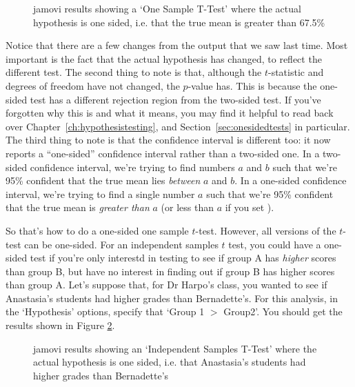 \begin{figure}[h]
\begin{center}
\caption{jamovi results showing a `One Sample T-Test' where the actual hypothesis is one sided, i.e. that the true mean is greater than 67.5\%}
\label{fig:ttest_onesided1}
\end{center}
\end{figure}

Notice that there are a few changes from the output that we saw last time. Most important is the fact that the actual hypothesis has changed, to reflect the different test. The second thing to note is that, although the $t$-statistic and degrees of freedom have not changed, the $p$-value has. This is because the one-sided test has a different rejection region from the two-sided test. If you've forgotten why this is and what it means, you may find it helpful to read back over Chapter~\ref{ch:hypothesistesting}, and Section~\ref{sec:onesidedtests} in particular. The third thing to note is that the confidence interval is different too: it now reports a ``one-sided'' confidence interval rather than a two-sided one. In a two-sided confidence interval, we're trying to find numbers $a$ and $b$ such that we're 95\% confident that the true mean lies {\it between} $a$ and $b$. In a one-sided confidence interval, we're trying to find a single number $a$ such that we're 95\% confident that the true mean is {\it greater than} $a$ (or less than $a$ if you set ).

So that's how to do a one-sided one sample $t$-test. However, all versions of the $t$-test can be one-sided. For an independent samples $t$ test, you could have a one-sided test if you're only interestd in testing to see if group A has {\it higher} scores than group B, but have no interest in finding out if group B has higher scores than group A. Let's suppose that, for Dr Harpo's class, you wanted to see if Anastasia's students had higher grades than Bernadette's. For this analysis, in the `Hypothesis' options, specify that `Group 1 $>$ Group2'. You should get the results shown in Figure \ref{fig:ttest_onesided2}.

\begin{figure}[h]
\begin{center}
\caption{jamovi results showing an `Independent Samples T-Test' where the actual hypothesis is one sided, i.e. that Anastasia's students had higher grades than Bernadette's}
\label{fig:ttest_onesided2}
\end{center}
\end{figure}

